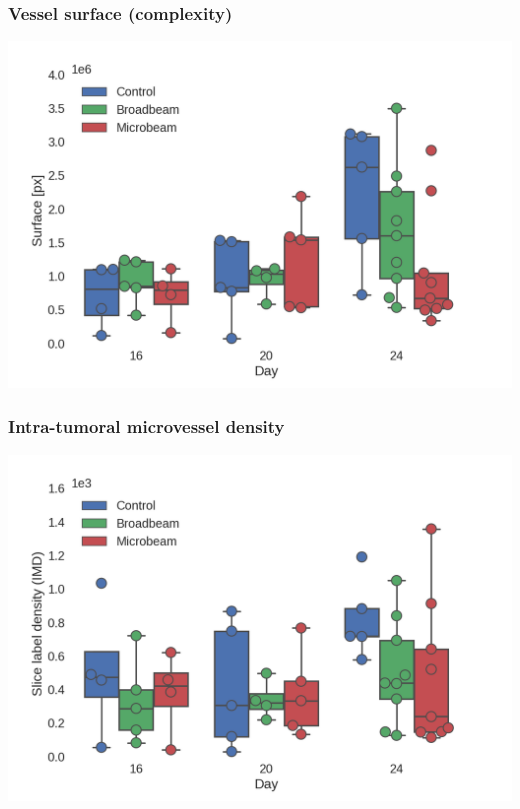 \documentclass[]{beamer}
\newcommand{\imsize}{\linewidth} %
\begin{document}
\begin{frame}
	\frametitle{Vessel surface (complexity)}
	\includegraphics[width=\imsize]{img/talk_surface_day}	
\end{frame}

\begin{frame}
	\frametitle{Intra-tumoral microvessel density}
	\includegraphics[width=\imsize]{img/talk_imd_day}	
\end{frame}
\end{document}
